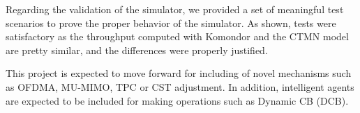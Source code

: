 \documentclass[a4paper]{article}
\begin{document}
Regarding the validation of the simulator, we provided a set of meaningful test scenarios to prove the proper behavior of the simulator. As shown, tests were satisfactory as the throughput computed with Komondor and the CTMN model are pretty similar, and the differences were properly justified.

This project is expected to move forward for including of novel mechanisms such as OFDMA, MU-MIMO, TPC or  CST adjustment. In addition, intelligent agents are expected to be included for making operations such as Dynamic CB (DCB).



\end{document}

